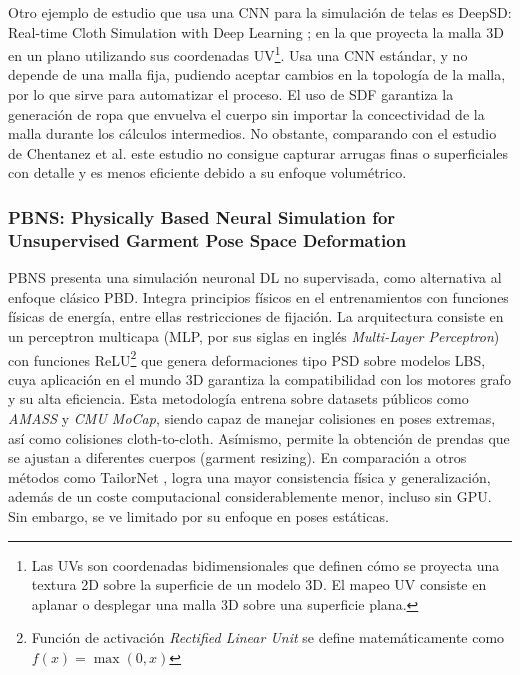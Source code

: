 Otro ejemplo de estudio que usa una CNN para la simulación de telas es DeepSD: Real-time Cloth Simulation with Deep Learning \cite{bertiche_deepsd_2021}; en la que proyecta la malla 3D en un plano utilizando sus coordenadas UV\footnote{Las UVs son coordenadas bidimensionales que definen cómo se proyecta una textura 2D sobre la superficie de un modelo 3D. El mapeo UV consiste en aplanar o desplegar una malla 3D sobre una superficie plana. }. Usa una CNN estándar, y no depende de una malla fija, pudiendo aceptar cambios en la topología de la malla, por lo que sirve para automatizar el proceso. El uso de SDF garantiza la generación de ropa que envuelva el cuerpo sin importar la concectividad de la malla durante los cálculos intermedios. No obstante, comparando con el estudio de  Chentanez et al. este estudio no consigue capturar arrugas finas o superficiales con detalle y es menos eficiente debido a su enfoque volumétrico. 

\subsubsection{PBNS: Physically Based Neural Simulation for Unsupervised Garment Pose Space Deformation}
PBNS \cite{bertiche2021PBNS} presenta una simulación neuronal DL no supervisada, como alternativa al enfoque clásico PBD. Integra principios físicos en el entrenamientos con funciones físicas de energía, entre ellas restricciones de fijación. La arquitectura consiste en un perceptron multicapa (MLP, por sus siglas en inglés \textit{Multi-Layer Perceptron}) con funciones ReLU\footnote{Función de activación \textit{Rectified Linear Unit} se define matemáticamente como $f(x) = \max(0, x)$} que genera deformaciones tipo PSD sobre modelos LBS, cuya aplicación en el mundo 3D garantiza la compatibilidad con los motores grafo y su alta eficiencia. Esta metodología entrena sobre datasets públicos como \textit{AMASS} \cite{mahmood2019AMASS} y \textit{CMU MoCap}, siendo capaz de manejar colisiones en poses extremas, así como colisiones cloth-to-cloth. Asímismo, permite la obtención de  prendas que se ajustan a diferentes cuerpos (garment resizing). En comparación a otros métodos como TailorNet \cite{patel2020tailornet}, logra una mayor consistencia física y generalización, además de un coste computacional considerablemente menor, incluso sin GPU. Sin embargo, se ve limitado por su enfoque en poses estáticas.

